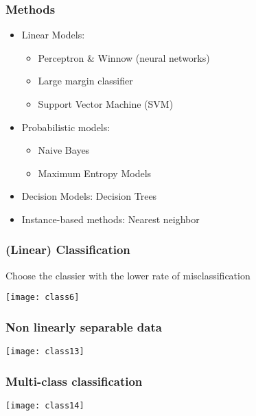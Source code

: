 \begin{frame}[fragile]
  \frametitle{Methods}
\begin{itemize}
\item Linear Models:
\begin{itemize}
\item Perceptron \& Winnow (neural networks)
\item Large margin classifier 
\item Support Vector Machine (SVM)
\end{itemize}
\item Probabilistic models:
\begin{itemize}
\item Naive Bayes
\item Maximum Entropy Models
\end{itemize}
\item Decision Models: Decision Trees
\item Instance-based methods: Nearest neighbor
\end{itemize}
\end{frame}

\begin{frame}[fragile]
  \frametitle{(Linear) Classification}
Choose the classier with the lower rate of misclassification
\begin{center}
\texttt{[image: class6]}
\end{center}
\end{frame}

\begin{frame}[fragile]
  \frametitle{Non linearly separable data}
\begin{center}
\texttt{[image: class13]}
\end{center}
\end{frame}

\begin{frame}[fragile]
  \frametitle{Multi-class classification}
\begin{center}
\texttt{[image: class14]}
\end{center}
\end{frame}

